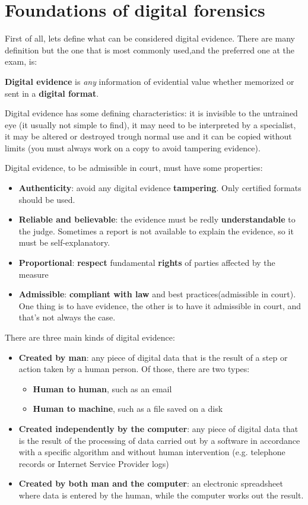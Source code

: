 \chapter{Foundations of digital forensics}
First of all, lets define what can be considered digital evidence.
There are many definition but the one that is most commonly used,and
the preferred one at the exam, is:
\begin{boxH}
  \textbf{Digital evidence} is \textit{any} information of evidential
  value whether memorized or sent in a \textbf{digital format}.
\end{boxH}
Digital evidence has some defining characteristics: it is invisible to
the untrained eye (it usually not simple to find), it may need to be
interpreted by a specialist, it may be altered or destroyed trough
normal use and it can be copied without limits (you must always work
on a copy to avoid tampering evidence).

Digital evidence, to be admissible in court, must have some
properties:
\begin{itemize}
  \item \textbf{Authenticity}: avoid any digital evidence
    \textbf{tampering}. Only certified formats should be used.
  \item \textbf{Reliable and believable}: the evidence must be redly
    \textbf{understandable} to the judge. Sometimes a report is not
    available to explain the evidence, so it must be self-explanatory.
  \item \textbf{Proportional}: \textbf{respect} fundamental
    \textbf{rights} of parties affected by the measure
  \item \textbf{Admissible}: \textbf{compliant with law} and best
    practices(admissible in court). One thing is to have evidence, the
    other is to have it admissible in court, and that's not always the
    case.
\end{itemize}

There are three main kinds of digital evidence:
\begin{itemize}
  \item \textbf{Created by man}: any piece of digital data that is the
    result of a step or action taken by a human person. Of those,
    there are two types:
    \begin{itemize}
      \item \textbf{Human to human}, such as an email
      \item \textbf{Human to machine}, such as a file saved on a disk
    \end{itemize}
  \item \textbf{Created independently by the computer}: any piece of
    digital data that is the result of the processing of data carried
    out by a software in accordance with a specific algorithm and
    without human intervention (e.g. telephone records or Internet
    Service Provider logs)
  \item \textbf{Created by both man and the computer}: an electronic
    spreadsheet where data is entered by the human, while the computer
    works out the result.
\end{itemize}

